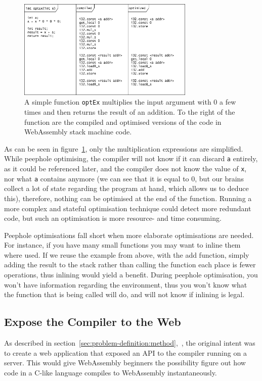 \documentclass[a4paper]{article}
\begin{document}
\begin{figure}[H]
	\includegraphics[width=0.75\textwidth]{PeepholeOptimisation}
	\centering
	\caption{A simple function \texttt{optEx} multiplies the input argument with $0$ a few times and then returns the result of an addition. To the right of the function are the compiled and optimised versions of the code in WebAssembly stack machine code.}
\label{fig:peephole-optimisation}
\end{figure}
As can be seen in figure~\ref{fig:peephole-optimisation}, only the multiplication expressions are simplified. While peephole optimising, the compiler will not know if it can discard \texttt{a} entirely, as it could be referenced later, and the compiler does not know the value of \texttt{x}, nor what \texttt{a} contains anymore (we can see that it is equal to $0$, but our brains collect a lot of state regarding the program at hand, which allows us to deduce this), therefore, nothing can be optimised at the end of the function. Running a more complex and stateful optimisation technique could detect more redundant code, but such an optimisation is more resource- and time consuming.

Peephole optimisations fall short when more elaborate optimisations are needed. For instance, if you have many small functions you may want to inline them where used. If we reuse the example from above, with the add function, simply adding the result to the stack rather than calling the function each place is fewer operations, thus inlining would yield a benefit. During peephole optimisation, you won't have information regarding the environment, thus you won’t know what the function that is being called will do, and will not know if inlining is legal.

\subsection{Expose the Compiler to the Web}
As described in section~\ref{sec:problem-definition:method},~, the original intent was to create a web application that exposed an API to the compiler running on a server. This would give WebAssembly beginners the possibility figure out how code in a C-like language compiles to WebAssembly instantaneously.
\end{document}
